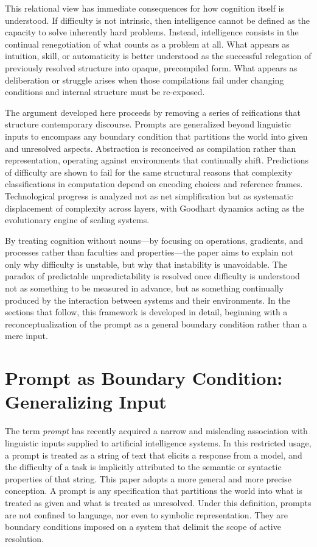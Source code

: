 \documentclass[12pt]{article}
\begin{document}
This relational view has immediate consequences for how cognition itself is understood. If difficulty is not intrinsic, then intelligence cannot be defined as the capacity to solve inherently hard problems. Instead, intelligence consists in the continual renegotiation of what counts as a problem at all. What appears as intuition, skill, or automaticity is better understood as the successful relegation of previously resolved structure into opaque, precompiled form. What appears as deliberation or struggle arises when those compilations fail under changing conditions and internal structure must be re-exposed.

The argument developed here proceeds by removing a series of reifications that structure contemporary discourse. Prompts are generalized beyond linguistic inputs to encompass any boundary condition that partitions the world into given and unresolved aspects. Abstraction is reconceived as compilation rather than representation, operating against environments that continually shift. Predictions of difficulty are shown to fail for the same structural reasons that complexity classifications in computation depend on encoding choices and reference frames. Technological progress is analyzed not as net simplification but as systematic displacement of complexity across layers, with Goodhart dynamics acting as the evolutionary engine of scaling systems.

By treating cognition without nouns—by focusing on operations, gradients, and processes rather than faculties and properties—the paper aims to explain not only why difficulty is unstable, but why that instability is unavoidable. The paradox of predictable unpredictability is resolved once difficulty is understood not as something to be measured in advance, but as something continually produced by the interaction between systems and their environments. In the sections that follow, this framework is developed in detail, beginning with a reconceptualization of the prompt as a general boundary condition rather than a mere input.

\section{Prompt as Boundary Condition: Generalizing Input}

The term \emph{prompt} has recently acquired a narrow and misleading association with linguistic inputs supplied to artificial intelligence systems. In this restricted usage, a prompt is treated as a string of text that elicits a response from a model, and the difficulty of a task is implicitly attributed to the semantic or syntactic properties of that string. This paper adopts a more general and more precise conception. A prompt is any specification that partitions the world into what is treated as given and what is treated as unresolved. Under this definition, prompts are not confined to language, nor even to symbolic representation. They are boundary conditions imposed on a system that delimit the scope of active resolution.
\end{document}
